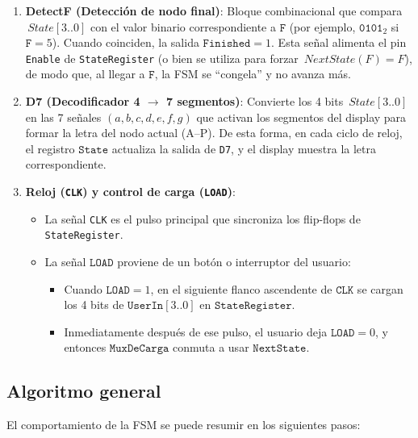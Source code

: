 \documentclass[12pt]{article}
\begin{document}
\begin{enumerate}
  \item \textbf{DetectF (Detección de nodo final)}:  
        Bloque combinacional que compara \(\,State[3..0]\) con el valor binario correspondiente a 
        \(\texttt{F}\) (por ejemplo, \(\texttt{0101}_2\) si \(\texttt{F}=5\)).  
        Cuando coinciden, la salida \(\texttt{Finished}=1\). Esta señal alimenta el pin 
        \texttt{Enable} de \texttt{StateRegister} (o bien se utiliza para forzar 
        \(\,NextState(F)=F\)), de modo que, al llegar a \(\texttt{F}\), la FSM se “congela” 
        y no avanza más.

  \item \textbf{D7 (Decodificador 4 \(\to\) 7 segmentos)}:  
        Convierte los 4 bits \(\,State[3..0]\) en las 7 señales \((a,b,c,d,e,f,g)\) que activan 
        los segmentos del display para formar la letra del nodo actual (A–P).  
        De esta forma, en cada ciclo de reloj, el registro \(\texttt{State}\) actualiza la salida de 
        \texttt{D7}, y el display muestra la letra correspondiente.

  \item \textbf{Reloj (\texttt{CLK}) y control de carga (\texttt{LOAD})}:  
        \begin{itemize}
          \item La señal \texttt{CLK} es el pulso principal que sincroniza los flip-flops de 
                \texttt{StateRegister}.  
          \item La señal \(\texttt{LOAD}\) proviene de un botón o interruptor del usuario:  
            \begin{itemize}
              \item Cuando \(\texttt{LOAD}=1\), en el siguiente flanco ascendente de \(\texttt{CLK}\) 
                    se cargan los 4 bits de \(\texttt{UserIn}[3..0]\) en \(\texttt{StateRegister}\).  
              \item Inmediatamente después de ese pulso, el usuario deja \(\texttt{LOAD}=0\), y 
                    entonces \(\texttt{MuxDeCarga}\) conmuta a usar \(\texttt{NextState}\).  
            \end{itemize}
        \end{itemize}
\end{enumerate}

\subsection{Algoritmo general}

El comportamiento de la FSM se puede resumir en los siguientes pasos:
\end{document}
